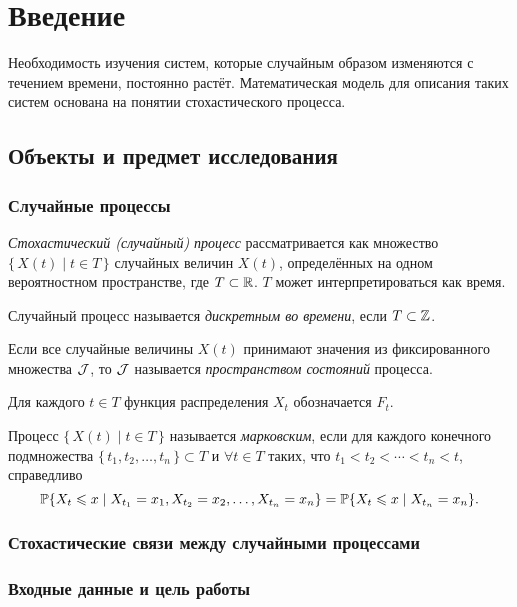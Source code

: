 \chapter*{Введение}							%

Необходимость изучения систем, которые случайным образом изменяются с течением времени, постоянно растёт. Математическая модель для описания таких систем основана на понятии стохастического процесса.

\section*{Объекты и предмет исследования}
\subsection*{Случайные процессы}

\emph{Стохастический (случайный) процесс} рассматривается как множество $\{\, X(t) \mid t \in T \,\}$ случайных величин $X(t)$, определённых на одном вероятностном пространстве, где $T \subset \R$. $T$ может интерпретироваться как время.
\begin{define}
	Случайный процесс называется \emph{дискретным во времени}, если $T \subset \Z$.
\end{define}
\begin{define}
 	Если все случайные величины $X(t)$ принимают значения из фиксированного множества $\J$, то $\J$ называется \emph{пространством состояний} процесса.
\end{define}
Для каждого $t \in T$ функция распределения $X_t$ обозначается $F_t$.
\begin{define}
	Процесс $\{\, X(t) \mid t \in T \,\}$ называется \emph{марковским}, если для каждого конечного подмножества $\{\, t_1, t_2, \ldots, t_n \,\} \subset T$ и $\forall t \in T$ таких, что $t_1 < t_2 < \cdots < t_n < t$, справедливо
\[
\P\{X_t \leqslant x \mid X_{t_1} = x_1, X_{t_2} = x_2, \ldots, X_{t_n} = x_n\} = \P\{X_t \leqslant x \mid X_{t_n} = x_n\}.
\]
\end{define}

\subsection*{Стохастические связи между случайными процессами}

\subsection*{Входные данные и цель работы}

